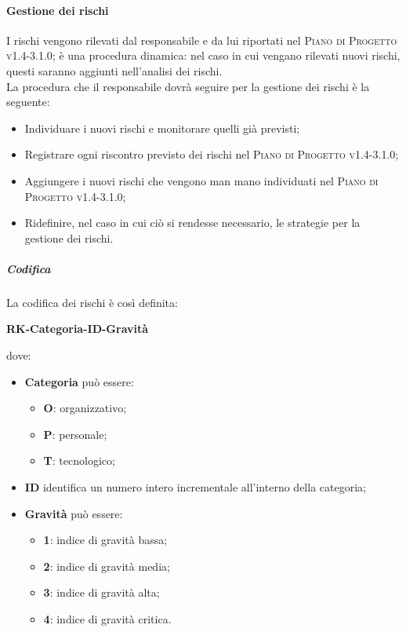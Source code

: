 \paragraph{Gestione dei rischi}
I rischi vengono rilevati dal responsabile e da lui riportati nel \textsc{Piano di Progetto v1.4-3.1.0}; è una procedura dinamica: nel caso in cui vengano rilevati nuovi rischi, questi saranno aggiunti nell'analisi dei rischi. \\
La procedura che il responsabile dovrà seguire per la gestione dei rischi è la seguente:
\begin{itemize}
  \item Individuare i nuovi rischi e monitorare quelli già previsti;
  \item Registrare ogni riscontro previsto dei rischi nel \textsc{Piano di Progetto v1.4-3.1.0};
  \item Aggiungere i nuovi rischi che vengono man mano individuati nel \textsc{Piano di Progetto v1.4-3.1.0};
  \item Ridefinire, nel caso in cui ciò si rendesse necessario, le strategie per la gestione dei rischi.
\end{itemize}
\subparagraph*{Codifica}
La codifica dei rischi è così definita: \\
\begin{center}
\centering
\textbf{RK-Categoria-ID-Gravità}
\end{center} dove:
\begin{itemize}
  \item \textbf{Categoria} può essere:
  \begin{itemize}
    \item \textbf{O}: organizzativo;
    \item \textbf{P}: personale;
    \item \textbf{T}: tecnologico;
  \end{itemize}
  \item \textbf{ID} identifica un numero intero incrementale all'interno della categoria;
  \item \textbf{Gravità} può essere:
  \begin{itemize}
    \item \textbf{1}: indice di gravità bassa;
    \item \textbf{2}: indice di gravità media;
    \item \textbf{3}: indice di gravità alta;
    \item \textbf{4}: indice di gravità critica.
  \end{itemize}
\end{itemize}

